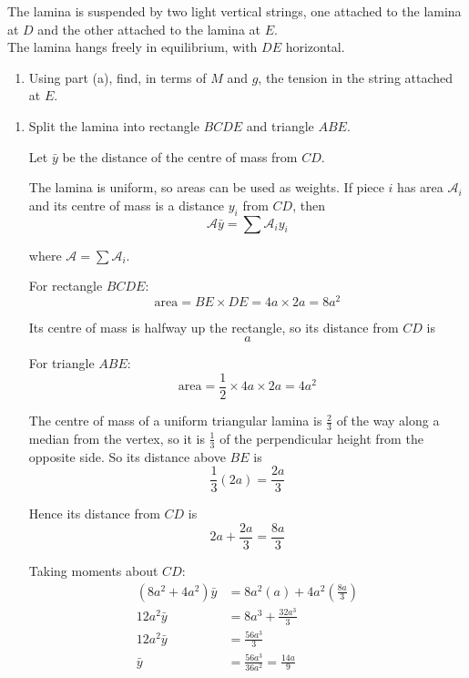 \documentclass[leqno]{article}
\begin{document}
\begin{enumerate}[
  label=\textbf{\arabic*.},
  leftmargin=*,
  topsep=0pt,
  partopsep=0pt,
  parsep=0pt
]
The lamina is suspended by two light vertical strings, one attached to the lamina at $D$ and the other attached to the lamina at $E$. \\

The lamina hangs freely in equilibrium, with $DE$ horizontal. \\
\begin{enumerate}[label=\textbf{(\alph*)}, resume]
  \item Using part (a), find, in terms of $M$ and $g$, the tension in the string attached at $E$.  \\
\end{enumerate}

\vspace*{10pt}

\begin{djsSolution}
\begin{enumerate}[label=\textbf{(\alph*)}, start=1]
  \item Split the lamina into rectangle $BCDE$ and triangle $ABE$.

Let $\bar y$ be the distance of the centre of mass from $CD$.

The lamina is uniform, so areas can be used as weights. If piece $i$ has area $\mathcal{A}_i$ and its centre of mass is a distance $y_i$ from $CD$, then
\[
\mathcal{A}\bar y=\sum\mathcal{A}_iy_i
\]

where $\mathcal{A}=\sum\mathcal{A}_i$.

For rectangle $BCDE$:
\[
\text{area}=BE\times DE=4a\times 2a=8a^2
\]

Its centre of mass is halfway up the rectangle, so its distance from $CD$ is
\[
a
\]

For triangle $ABE$:
\[
\text{area}=\frac12\times 4a\times 2a=4a^2
\]

The centre of mass of a uniform triangular lamina is $\frac23$ of the way along a median from the vertex, so it is $\frac13$ of the perpendicular height from the opposite side.
So its distance above $BE$ is
\[
\frac13(2a)=\frac{2a}{3}
\]

Hence its distance from $CD$ is
\[
2a+\frac{2a}{3}=\frac{8a}{3}
\]

Taking moments about $CD$:
\begin{align*}
(8a^2+4a^2)\bar y&=8a^2(a)+4a^2\left(\frac{8a}{3}\right)\\
12a^2\bar y&=8a^3+\frac{32a^3}{3}\\
12a^2\bar y&=\frac{56a^3}{3}\\
\bar y&=\frac{56a^3}{36a^2}=\frac{14a}{9}
\end{align*}


\end{enumerate}
\end{djsSolution}
\end{enumerate}
\end{document}
